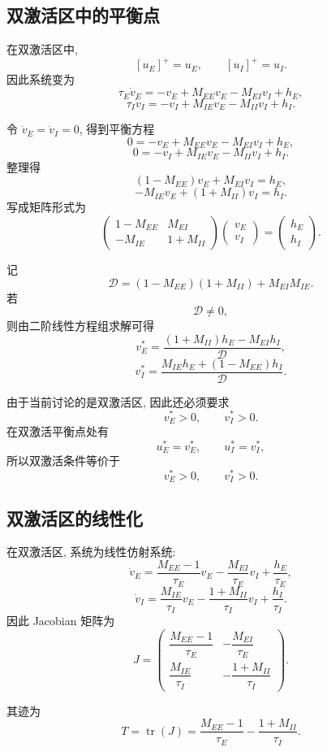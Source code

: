 ﻿\documentclass[UTF8,  zihao=-4]{ctexart}
\begin{document}
\subsection{双激活区中的平衡点}

在双激活区中,  
\[
[u_E]^+=u_E,  \qquad [u_I]^+=u_I.
\]
因此系统变为
\[
\tau_E\dot v_E
=
-v_E+M_{EE}v_E-M_{EI}v_I+h_E,  
\]
\[
\tau_I\dot v_I
=
-v_I+M_{IE}v_E-M_{II}v_I+h_I.
\]

令 \(\dot v_E=\dot v_I=0\),  得到平衡方程
\[
0
=
-v_E+M_{EE}v_E-M_{EI}v_I+h_E,  
\]
\[
0
=
-v_I+M_{IE}v_E-M_{II}v_I+h_I.
\]
整理得
\[
(1-M_{EE})v_E+M_{EI}v_I=h_E,  
\]
\[
-M_{IE}v_E+(1+M_{II})v_I=h_I.
\]
写成矩阵形式为
\[
\begin{pmatrix}
1-M_{EE} & M_{EI}\\
-M_{IE} & 1+M_{II}
\end{pmatrix}
\begin{pmatrix}
v_E\\
v_I
\end{pmatrix}
=
\begin{pmatrix}
h_E\\
h_I
\end{pmatrix}.
\]

记
\[
\mathcal D
=
(1-M_{EE})(1+M_{II})+M_{EI}M_{IE}.
\]
若
\[
\mathcal D\ne 0,  
\]
则由二阶线性方程组求解可得
\[
v_E^*
=
\frac{(1+M_{II})h_E-M_{EI}h_I}{\mathcal D},  
\]
\[
v_I^*
=
\frac{M_{IE}h_E+(1-M_{EE})h_I}{\mathcal D}.
\]

由于当前讨论的是双激活区,  因此还必须要求
\[
v_E^*>0,  \qquad v_I^*>0.
\]
在双激活平衡点处有
\[
u_E^*=v_E^*,  \qquad u_I^*=v_I^*,  
\]
所以双激活条件等价于
\[
v_E^*>0,  \qquad v_I^*>0.
\]

\subsection{双激活区的线性化}

在双激活区,  系统为线性仿射系统:
\[
\dot v_E
=
\frac{M_{EE}-1}{\tau_E}v_E
-
\frac{M_{EI}}{\tau_E}v_I
+
\frac{h_E}{\tau_E},  
\]
\[
\dot v_I
=
\frac{M_{IE}}{\tau_I}v_E
-
\frac{1+M_{II}}{\tau_I}v_I
+
\frac{h_I}{\tau_I}.
\]
因此 Jacobian 矩阵为
\[
J
=
\begin{pmatrix}
\dfrac{M_{EE}-1}{\tau_E}
&
-\dfrac{M_{EI}}{\tau_E}
\\[1.2em]
\dfrac{M_{IE}}{\tau_I}
&
-\dfrac{1+M_{II}}{\tau_I}
\end{pmatrix}.
\]

其迹为
\[
T=\operatorname{tr}(J)
=
\frac{M_{EE}-1}{\tau_E}
-
\frac{1+M_{II}}{\tau_I}.
\]
\end{document}

